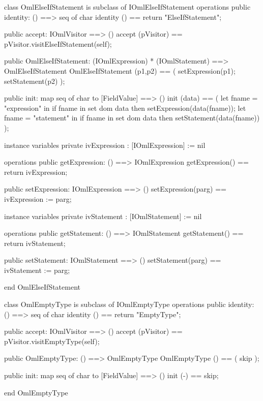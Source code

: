 \begin{vdm_al}
class OmlElseIfStatement is subclass of IOmlElseIfStatement
operations
  public identity: () ==> seq of char
  identity () == return "ElseIfStatement";

  public accept: IOmlVisitor ==> ()
  accept (pVisitor) == pVisitor.visitElseIfStatement(self);

  public OmlElseIfStatement:
      (IOmlExpression) *
      (IOmlStatement) ==> OmlElseIfStatement
  OmlElseIfStatement (p1,p2) == 
   ( setExpression(p1);
     setStatement(p2) );

  public init: map seq of char to [FieldValue] ==> ()
  init (data) ==
    ( let fname = "expression" in
        if fname in set dom data
        then setExpression(data(fname));
      let fname = "statement" in
        if fname in set dom data
        then setStatement(data(fname)) );

instance variables
  private ivExpression : [IOmlExpression] := nil

operations
  public getExpression: () ==> IOmlExpression
  getExpression() == return ivExpression;

  public setExpression: IOmlExpression ==> ()
  setExpression(parg) == ivExpression := parg;

instance variables
  private ivStatement : [IOmlStatement] := nil

operations
  public getStatement: () ==> IOmlStatement
  getStatement() == return ivStatement;

  public setStatement: IOmlStatement ==> ()
  setStatement(parg) == ivStatement := parg;

end OmlElseIfStatement
\end{vdm_al}

\begin{vdm_al}
class OmlEmptyType is subclass of IOmlEmptyType
operations
  public identity: () ==> seq of char
  identity () == return "EmptyType";

  public accept: IOmlVisitor ==> ()
  accept (pVisitor) == pVisitor.visitEmptyType(self);

  public OmlEmptyType:
      () ==> OmlEmptyType
  OmlEmptyType () == 
    ( skip );

  public init: map seq of char to [FieldValue] ==> ()
  init (-) == skip;

end OmlEmptyType
\end{vdm_al}

